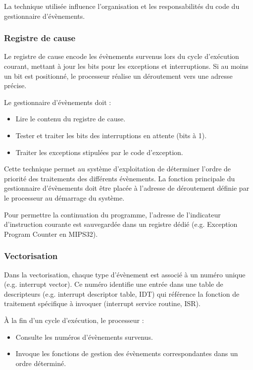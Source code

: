 La technique utilisée influence l'organisation et les responsabilités du code du gestionnaire d'évènements.


\subsubsection{Registre de cause}

Le registre de cause encode les évènements survenus lors du cycle d’exécution courant, mettant à jour les bits pour les exceptions et interruptions. 
Si au moins un bit est positionné, le processeur réalise un déroutement vers une adresse précise.

Le gestionnaire d’évènements doit :
\begin{itemize}
    \item Lire le contenu du registre de cause.
    \item Tester et traiter les bits des interruptions en attente (bits à 1).
    \item Traiter les exceptions stipulées par le code d’exception.
\end{itemize}

Cette technique permet au système d’exploitation de déterminer l’ordre de priorité des traitements des différents évènements. 
La fonction principale du gestionnaire d’évènements doit être placée à l’adresse de déroutement définie par le processeur au démarrage du système.

Pour permettre la continuation du programme, l’adresse de l’indicateur d’instruction courante est sauvegardée dans un registre dédié (e.g. Exception Program Counter en MIPS32).


\subsubsection{Vectorisation}

Dans la vectorisation, chaque type d'évènement est associé à un numéro unique (e.g. interrupt vector). 
Ce numéro identifie une entrée dans une table de descripteurs (e.g. interrupt descriptor table, IDT) qui référence la fonction de traitement spécifique à invoquer (interrupt service routine, ISR).

À la fin d’un cycle d’exécution, le processeur :
\begin{itemize}
    \item Consulte les numéros d’évènements survenus.
    \item Invoque les fonctions de gestion des évènements correspondantes dans un ordre déterminé.
\end{itemize}

